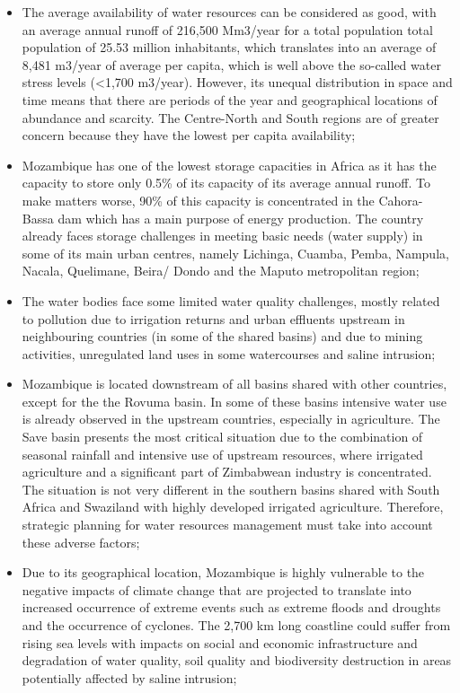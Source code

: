 \documentclass[
]{book}
\begin{document}
\begin{itemize}
\item
  The average availability of water resources can be considered as good, with an average annual runoff of 216,500 Mm3/year for a total population total population of 25.53 million inhabitants, which translates into an average of 8,481 m3/year of average per capita, which is well above the so-called water stress levels (\textless1,700 m3/year). However, its unequal distribution in space and time means that there are periods of the year and geographical locations of abundance and scarcity. The Centre-North and South regions are of greater concern because they have the lowest per capita availability;
\item
  Mozambique has one of the lowest storage capacities in Africa as it has the capacity to store only 0.5\% of its capacity of its average annual runoff. To make matters worse, 90\% of this capacity is concentrated in the Cahora-Bassa dam which has a main purpose of energy production. The country already faces storage challenges in meeting basic needs (water supply) in some of its main urban centres, namely Lichinga, Cuamba, Pemba, Nampula, Nacala, Quelimane, Beira/ Dondo and the Maputo metropolitan region;
\item
  The water bodies face some limited water quality challenges, mostly related to pollution due to irrigation returns and urban effluents upstream in neighbouring countries (in some of the shared basins) and due to mining activities, unregulated land uses in some watercourses and saline intrusion;
\item
  Mozambique is located downstream of all basins shared with other countries, except for the the Rovuma basin. In some of these basins intensive water use is already observed in the upstream countries, especially in agriculture. The Save basin presents the most critical situation due to the combination of seasonal rainfall and intensive use of upstream resources, where irrigated agriculture and a significant part of Zimbabwean industry is concentrated. The situation is not very different in the southern basins shared with South Africa and Swaziland with highly developed irrigated agriculture. Therefore, strategic planning for water resources management must take into account these adverse factors;
\item
  Due to its geographical location, Mozambique is highly vulnerable to the negative impacts of climate change that are projected to translate into increased occurrence of extreme events such as extreme floods and droughts and the occurrence of cyclones. The 2,700 km long coastline could suffer from rising sea levels with impacts on social and economic infrastructure and degradation of water quality, soil quality and biodiversity destruction in areas potentially affected by saline intrusion;

\end{itemize}
\end{document}
